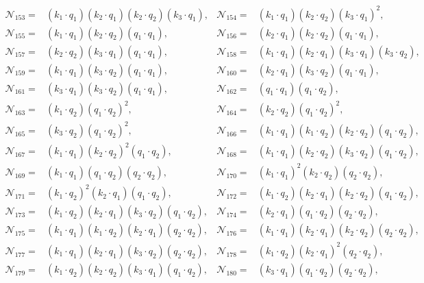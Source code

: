 \documentclass[twocolumn,aps,showpacs,nofootinbib,superscriptaddress,prd]{revtex4-2}
\begin{document}
\begin{widetext}
\begin{align}
{\mathcal N}_{153}=&(k_1\cdot q_1) (k_2\cdot q_1) (k_2\cdot q_2) (k_3\cdot q_1),&
{\mathcal N}_{154}=&(k_1\cdot q_1) (k_2\cdot q_2) (k_3\cdot q_1)^2,\nonumber\\
{\mathcal N}_{155}=&(k_1\cdot q_1) (k_2\cdot q_2) (q_1\cdot q_1),&
{\mathcal N}_{156}=&(k_2\cdot q_1) (k_2\cdot q_2) (q_1\cdot q_1),\nonumber\\
{\mathcal N}_{157}=&(k_2\cdot q_2) (k_3\cdot q_1) (q_1\cdot q_1),&
{\mathcal N}_{158}=&(k_1\cdot q_1) (k_2\cdot q_1) (k_3\cdot q_1) (k_3\cdot q_2),\nonumber\\
{\mathcal N}_{159}=&(k_1\cdot q_1) (k_3\cdot q_2) (q_1\cdot q_1),&
{\mathcal N}_{160}=&(k_2\cdot q_1) (k_3\cdot q_2) (q_1\cdot q_1),\nonumber\\
{\mathcal N}_{161}=&(k_3\cdot q_1) (k_3\cdot q_2) (q_1\cdot q_1),&
{\mathcal N}_{162}=&(q_1\cdot q_1) (q_1\cdot q_2),\nonumber\\
{\mathcal N}_{163}=&(k_1\cdot q_2) (q_1\cdot q_2)^2,&
{\mathcal N}_{164}=&(k_2\cdot q_2) (q_1\cdot q_2)^2,\nonumber\\
{\mathcal N}_{165}=&(k_3\cdot q_2) (q_1\cdot q_2)^2,&
{\mathcal N}_{166}=&(k_1\cdot q_1) (k_1\cdot q_2) (k_2\cdot q_2) (q_1\cdot q_2),\nonumber\\
{\mathcal N}_{167}=&(k_1\cdot q_1) (k_2\cdot q_2)^2 (q_1\cdot q_2),&
{\mathcal N}_{168}=&(k_1\cdot q_1) (k_2\cdot q_2) (k_3\cdot q_2) (q_1\cdot q_2),\nonumber\\
{\mathcal N}_{169}=&(k_1\cdot q_1) (q_1\cdot q_2) (q_2\cdot q_2),&
{\mathcal N}_{170}=&(k_1\cdot q_1)^2 (k_2\cdot q_2) (q_2\cdot q_2),\nonumber\\
{\mathcal N}_{171}=&(k_1\cdot q_2)^2 (k_2\cdot q_1) (q_1\cdot q_2),&
{\mathcal N}_{172}=&(k_1\cdot q_2) (k_2\cdot q_1) (k_2\cdot q_2) (q_1\cdot q_2),\nonumber\\
{\mathcal N}_{173}=&(k_1\cdot q_2) (k_2\cdot q_1) (k_3\cdot q_2) (q_1\cdot q_2),&
{\mathcal N}_{174}=&(k_2\cdot q_1) (q_1\cdot q_2) (q_2\cdot q_2),\nonumber\\
{\mathcal N}_{175}=&(k_1\cdot q_1) (k_1\cdot q_2) (k_2\cdot q_1) (q_2\cdot q_2),&
{\mathcal N}_{176}=&(k_1\cdot q_1) (k_2\cdot q_1) (k_2\cdot q_2) (q_2\cdot q_2),\nonumber\\
{\mathcal N}_{177}=&(k_1\cdot q_1) (k_2\cdot q_1) (k_3\cdot q_2) (q_2\cdot q_2),&
{\mathcal N}_{178}=&(k_1\cdot q_2) (k_2\cdot q_1)^2 (q_2\cdot q_2),\nonumber\\
{\mathcal N}_{179}=&(k_1\cdot q_2) (k_2\cdot q_2) (k_3\cdot q_1) (q_1\cdot q_2),&
{\mathcal N}_{180}=&(k_3\cdot q_1) (q_1\cdot q_2) (q_2\cdot q_2),\nonumber\\

\end{align}
\end{widetext}
\end{document}
